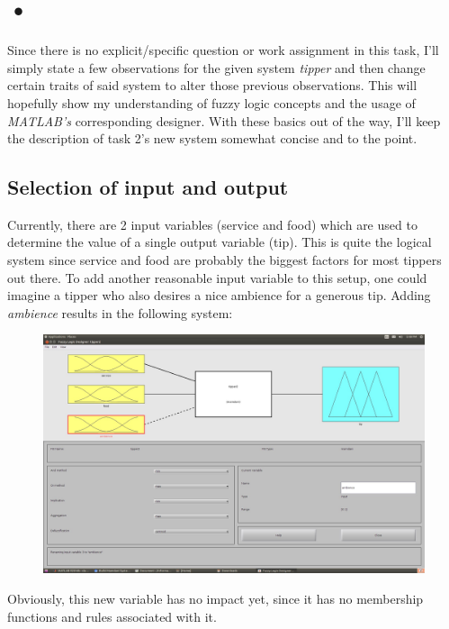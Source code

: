 \documentclass[a4paper, 11pt]{article}
\begin{document}
\section{•}
Since there is no explicit/specific question or work assignment in this task, I'll simply state a few observations for the given system \textit{tipper} and then change certain traits of said system to alter those previous observations. This will hopefully show my understanding of fuzzy logic concepts and the usage of \textit{MATLAB's} corresponding designer. With these basics out of the way, I'll keep the description of task 2's new system somewhat concise and to the point.

\subsection{Selection of input and output}
Currently, there are 2 input variables (service and food) which are used to determine the value of a single output variable (tip). This is quite the logical system since service and food are probably the biggest factors for most tippers out there. To add another reasonable input variable to this setup, one could imagine a tipper who also desires a nice ambience for a generous tip. Adding \textit{ambience} results in the following system:

\begin{figure}[ht]
\includegraphics[scale=0.2]{1-overview.jpg}
\end{figure}
Obviously, this new variable has no impact yet, since it has no membership functions and rules associated with it.

\newpage
\end{document}
